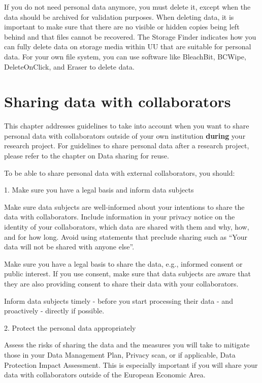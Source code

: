 \documentclass[
]{book}
\begin{document}
If you do not need personal data anymore, you must delete it, except when the data
should be archived for validation purposes. When deleting data, it is important
to make sure that there are no visible or hidden copies being left behind and
that files cannot be recovered. The Storage Finder
indicates how you can fully delete data on storage media within UU that are
suitable for personal data. For your own file system, you can use software like
BleachBit,
BCWipe,
DeleteOnClick,
and Eraser to delete data.

\hypertarget{data-sharing-collaboration}{%
\chapter{Sharing data with collaborators}\label{data-sharing-collaboration}}

This chapter addresses guidelines to take into account when you want to share
personal data with collaborators outside of your own institution \textbf{during}
your research project. For guidelines to share personal data after a research
project, please refer to the chapter on
Data sharing for reuse.

To be able to share personal data with external collaborators, you should:

1. Make sure you have a legal basis and
inform data subjects

Make sure data subjects are well-informed about your intentions to
share the data with collaborators. Include information in your
privacy notice on the identity of your
collaborators, which data are shared with them and why, how, and for how
long. Avoid using statements that preclude sharing such as ``Your data
will not be shared with anyone else''.

Make sure you have a legal basis to
share the data, e.g., informed consent or public interest. If you use
consent, make sure that data subjects are aware that they are also
providing consent to share their data with your collaborators.

Inform data subjects timely - before you start processing
their data - and proactively - directly if possible.

2. Protect the personal data appropriately

Assess the risks of sharing the
data and the measures you will take to mitigate those in your
Data Management Plan, Privacy scan,
or if applicable, Data Protection Impact Assessment.
This is especially important if you will share your data with
collaborators outside of the European Economic Area.
\end{document}
